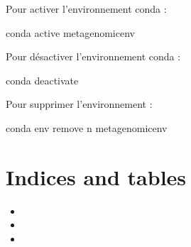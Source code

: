 \documentclass[letterpaper,10pt,french]{sphinxmanual}
\begin{document}
Pour activer l’environnement conda :

\begin{sphinxVerbatim}[commandchars=\\\{\}]
conda active metagenomic\PYGZus{}env
\end{sphinxVerbatim}

Pour désactiver l’environnement conda :

\begin{sphinxVerbatim}[commandchars=\\\{\}]
conda deactivate
\end{sphinxVerbatim}

Pour supprimer l’environnement :

\begin{sphinxVerbatim}[commandchars=\\\{\}]
conda env remove \PYGZhy{}n metagenomic\PYGZus{}env
\end{sphinxVerbatim}


\chapter{Indices and tables}
\label{\detokenize{index:indices-and-tables}}\begin{itemize}
\item {} 

\item {} 

\item {} 

\end{itemize}



\renewcommand{\indexname}{Index}
\printindex
\end{document}
